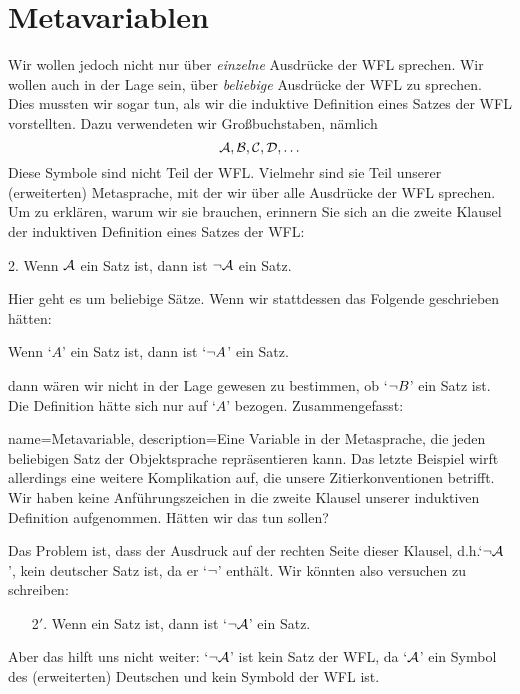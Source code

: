 \section{Metavariablen}\label{s:Metavariables}
Wir wollen jedoch nicht nur über \emph{einzelne} Ausdrücke der WFL sprechen. Wir wollen auch in der Lage sein, über \emph{beliebige} Ausdrücke der WFL zu sprechen. Dies mussten wir sogar tun, als wir die induktive Definition eines Satzes der WFL vorstellten. Dazu verwendeten wir Gro{\ss}buchstaben, nämlich
	$$\mathcal{A}, \mathcal{B}, \mathcal{C}, \mathcal{D}, \ldots$$
Diese Symbole sind nicht Teil der WFL. Vielmehr sind sie Teil unserer (erweiterten) Metasprache, mit der wir über alle Ausdrücke der WFL sprechen. Um zu erklären, warum wir sie brauchen, erinnern Sie sich an die zweite Klausel der induktiven Definition eines Satzes der WFL:
	\begin{earg}
		\item[2.] Wenn $\mathcal{A}$ ein Satz ist, dann ist $\neg \mathcal{A}$ ein Satz.
	\end{earg}
Hier geht es um beliebige Sätze. Wenn wir stattdessen das Folgende geschrieben hätten:
	\begin{ebullet}
		\item Wenn `$A$' ein Satz ist, dann ist `$\neg A$' ein Satz.
	\end{ebullet}
dann wären wir nicht in der Lage gewesen zu bestimmen, ob `$\neg B$' ein Satz ist. Die Definition hätte sich nur auf `$A$' bezogen. Zusammengefasst:

{
name=Metavariable,
description={Eine Variable in der Metasprache, die jeden beliebigen Satz der Objektsprache repräsentieren kann.}
}
Das letzte Beispiel wirft allerdings eine weitere Komplikation auf, die unsere Zitierkonventionen betrifft. Wir haben keine Anführungszeichen in die zweite Klausel unserer induktiven Definition aufgenommen. Hätten wir das tun sollen?

Das Problem ist, dass der Ausdruck auf der rechten Seite dieser Klausel, d.h.\@ `$\neg\mathcal{A}$', kein deutscher Satz ist, da er `$\neg$' enthält. Wir könnten also versuchen zu schreiben:
	\begin{enumerate}
		\item[2$'$.] Wenn  ein Satz ist, dann ist `$\neg \mathcal{A}$' ein Satz.
	\end{enumerate}
Aber das hilft uns nicht weiter: `$\neg \mathcal{A}$' ist kein Satz der WFL, da `$\mathcal{A}$' ein Symbol des (erweiterten) Deutschen und kein Symbold der WFL ist.

